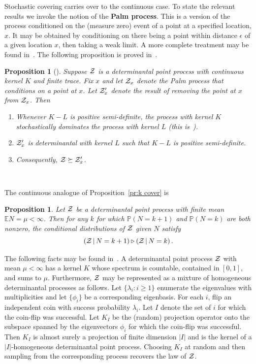 \documentclass[10pt]{article}
\theoremstyle{plain}
\newtheorem{pr}[thm]{Proposition}
\theoremstyle{remark}
\newcommand{\Em}[1]{\textbf{#1}}
\def\ee{\epsilon}
\def\E{{\mathbb E}}
\def\P{{\mathbb P}}
\def\|{{\, | \, }}
\def\ZZ{{\cal Z}}
\def\mcovers{\triangleright}
\def\mean{\mu}
\begin{document}
Stochastic covering carries over to the continuous case.
To state the relevant results we invoke the notion of
the \Em{Palm process}.  This is a version of the process
conditioned on the (measure zero) event of a point at a
specified location, $x$.  It may be obtained by conditioning
on there being a point within distance $\ee$ of a given
location $x$, then taking a weak limit.  A more complete
treatment may be found in~\cite{kallenberg}.  The   following proposition is proved
in~\cite{goldman10}.
%
\begin{pr}[] \label{pr:cover cont}
Suppose $\ZZ$ is a determinantal point process with continuous
kernel $K$ and finite trace.  Fix $x$ and let $\ZZ_x$ denote the
Palm process that conditions on a point at $x$.  Let $\ZZ_x'$
denote the result of removing the point at $x$ from $\ZZ_x$.
Then
\begin{enumerate} \romenumi
\item Whenever $K-L$ is positive semi-definite, the process with
kernel $K$ stochastically dominates the process with kernel $L$
(this is~\cite[Theorem~3]{goldman10}).
\item $\ZZ_x'$ is determinantal with kernel $L$ such that $K-L$ is
positive semi-definite.
\item Consequently, $\ZZ \succeq \ZZ_x'$.
\end{enumerate}~~\\[-4ex]
\end{pr}
 

   The continuous analogue
of Proposition~\ref{pr:k cover} is

\begin{pr} \label{eq:pr k cont}
Let $\ZZ$ be a determinantal point process with finite mean
$\E N = \mean < \infty$.  Then for any $k$ for which $\P (N = k+1)$
and $\P (N = k)$ are both nonzero, the conditional distributions
of $\ZZ$ given $N$ satisfy
$$( \ZZ \| N = k+1) \mcovers (\ZZ \| N = k) \, .$$
\end{pr}

The following facts may be found in~\cite[Theorem~7]{HKPV-PS}.
A determinantal point process $\ZZ$ with mean $\mean < \infty$
has a kernel $K$ whose spectrum is countable, contained in $[0,1]$,
and sums to $\mean$.  Furthermore, $\ZZ$ may be represented as a
mixture of homogeneous determinantal processes as follows.
Let $\{ \lambda_i : i \geq 1 \}$ enumerate the eigenvalues
with multiplicities and let $\{ \phi_i \}$ be a corresponding
eigenbasis.  For each $i$, flip an independent coin with success
probability $\lambda_i$.  Let $I$ denote the set of $i$ for which
the coin-flip was successful.  Let $K_I$ be the (random) projection
operator onto the subspace spanned by the eigenvectors $\phi_i$
for which the coin-flip was successful.  Then $K_I$ is almost
surely a projection of finite dimension $|I|$ and is the kernel
of a $|I|$-homogeneous determinantal point process.  Choosing
$K_I$ at random and then sampling from the corresponding process
recovers the law of $\ZZ$.
\end{document}

